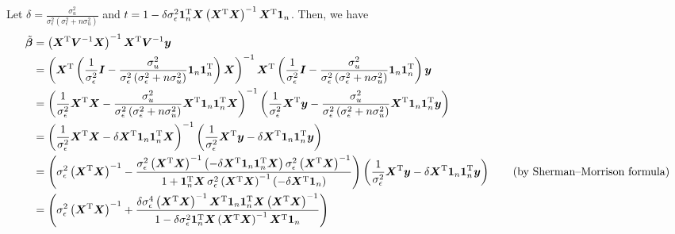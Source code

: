 \documentclass[a4paper]{article}
\begin{document}
Let $\delta = \frac{\sigma_{u}^{2}}{\sigma_{\epsilon}^{2}\left(\sigma_{\epsilon}^{2}+n\sigma_{u}^{2}\right)}$ and $t = 1 -\delta\sigma_{\epsilon}^{2}\bm{1}_{n}^{\rm T}\bm{X} \left(\bm{X}^{\rm T}\bm{X}\right)^{-1}\bm{X}^{\rm T}\bm{1}_{n}$. Then, we have 
\begin{align*}
\tilde{\bm{\beta}} &= \left(\bm{X}^{\rm T}\bm{V}^{-1}\bm{X}\right)^{-1}\bm{X}^{\rm T}\bm{V}^{-1}\bm{y}\\
&= \left(\bm{X}^{\rm T}\left(\frac{1}{\sigma_{\epsilon}^{2}}\bm{I} -\frac{\sigma_{u}^{2}}{\sigma_{\epsilon}^{2}\left(\sigma_{\epsilon}^{2}+n\sigma_{u}^{2}\right)}\bm{1}_{n}\bm{1}_{n}^{\rm T}\right)\bm{X}\right)^{-1}
\bm{X}^{\rm T}\left(\frac{1}{\sigma_{\epsilon}^{2}}\bm{I} -\frac{\sigma_{u}^{2}}{\sigma_{\epsilon}^{2}\left(\sigma_{\epsilon}^{2}+n\sigma_{u}^{2}\right)}\bm{1}_{n}\bm{1}_{n}^{\rm T}\right)\bm{y}\\
&= \left(\frac{1}{\sigma_{\epsilon}^{2}}\bm{X}^{\rm T}\bm{X} -\frac{\sigma_{u}^{2}}{\sigma_{\epsilon}^{2}\left(\sigma_{\epsilon}^{2}+n\sigma_{u}^{2}\right)}\bm{X}^{\rm T}\bm{1}_{n}\bm{1}_{n}^{\rm T}\bm{X}\right)^{-1}
\left(\frac{1}{\sigma_{\epsilon}^{2}}\bm{X}^{\rm T}\bm{y} -\frac{\sigma_{u}^{2}}{\sigma_{\epsilon}^{2}\left(\sigma_{\epsilon}^{2}+n\sigma_{u}^{2}\right)}\bm{X}^{\rm T}\bm{1}_{n}\bm{1}_{n}^{\rm T}\bm{y}\right)\\
&= \left(\frac{1}{\sigma_{\epsilon}^{2}}\bm{X}^{\rm T}\bm{X} -\delta\bm{X}^{\rm T}\bm{1}_{n}\bm{1}_{n}^{\rm T}\bm{X}\right)^{-1} \left(\frac{1}{\sigma_{\epsilon}^{2}}\bm{X}^{\rm T}\bm{y} -\delta\bm{X}^{\rm T}\bm{1}_{n}\bm{1}_{n}^{\rm T}\bm{y}\right)\\
&= \left(\sigma_{\epsilon}^{2}\left(\bm{X}^{\rm T}\bm{X}\right)^{-1} -\frac{\sigma_{\epsilon}^{2}\left(\bm{X}^{\rm T}\bm{X}\right)^{-1}\left(-\delta\bm{X}^{\rm T}\bm{1}_{n}\bm{1}_{n}^{\rm T}\bm{X}\right)\sigma_{\epsilon}^{2}\left(\bm{X}^{\rm T}\bm{X}\right)^{-1}}{1+\bm{1}_{n}^{\rm T}\bm{X} \, \sigma_{\epsilon}^{2}\left(\bm{X}^{\rm T}\bm{X}\right)^{-1}\left(-\delta\bm{X}^{\rm T}\bm{1}_{n}\right)}\right)
\left(\frac{1}{\sigma_{\epsilon}^{2}}\bm{X}^{\rm T}\bm{y} -\delta\bm{X}^{\rm T}\bm{1}_{n}\bm{1}_{n}^{\rm T}\bm{y}\right) \tag{\mbox{by Sherman--Morrison formula}}\\
&= \left(\sigma_{\epsilon}^{2}\left(\bm{X}^{\rm T}\bm{X}\right)^{-1} +\frac{\delta\sigma_{\epsilon}^{4}\left(\bm{X}^{\rm T}\bm{X}\right)^{-1}\bm{X}^{\rm T}\bm{1}_{n}\bm{1}_{n}^{\rm T}\bm{X}\left(\bm{X}^{\rm T}\bm{X}\right)^{-1}}{1 -\delta\sigma_{\epsilon}^{2}\bm{1}_{n}^{\rm T}\bm{X} \left(\bm{X}^{\rm T}\bm{X}\right)^{-1}\bm{X}^{\rm T}\bm{1}_{n}}\right)

\end{align*}
\end{document}
